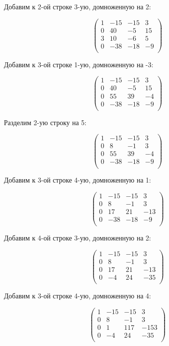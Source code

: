 	Добавим к 2-ой строке 3-ую, домноженную на 2:
	
	\[
	\begin{pmatrix}
	1 & -15 & -15 & 3 \\
	0 & 40 & -5 & 15 \\
	3 & 10 & -6 & 5 \\
	0 & -38 & -18 & -9 \\
	\end{pmatrix}
	\]
	
	Добавим к 3-ой строке 1-ую, домноженную на -3:
	
	\[
	\begin{pmatrix}
	1 & -15 & -15 & 3 \\
	0 & 40 & -5 & 15 \\
	0 & 55 & 39 & -4 \\
	0 & -38 & -18 & -9 \\
	\end{pmatrix}
	\]
	
	Разделим 2-ую строку на 5:
	
	\[
	\begin{pmatrix}
	1 & -15 & -15 & 3 \\
	0 & 8 & -1 & 3 \\
	0 & 55 & 39 & -4 \\
	0 & -38 & -18 & -9 \\
	\end{pmatrix}
	\]
	
	Добавим к 3-ой строке 4-ую, домноженную на 1:
	
	\[
	\begin{pmatrix}
	1 & -15 & -15 & 3 \\
	0 & 8 & -1 & 3 \\
	0 & 17 & 21 & -13 \\
	0 & -38 & -18 & -9 \\
	\end{pmatrix}
	\]
	
	Добавим к 4-ой строке 3-ую, домноженную на 2:
	
	\[
	\begin{pmatrix}
	1 & -15 & -15 & 3 \\
	0 & 8 & -1 & 3 \\
	0 & 17 & 21 & -13 \\
	0 & -4 & 24 & -35 \\
	\end{pmatrix}
	\]
	
	Добавим к 3-ой строке 4-ую, домноженную на 4:
	
	\[
	\begin{pmatrix}
	1 & -15 & -15 & 3 \\
	0 & 8 & -1 & 3 \\
	0 & 1 & 117 & -153 \\
	0 & -4 & 24 & -35 \\
	\end{pmatrix}
	\]
	

